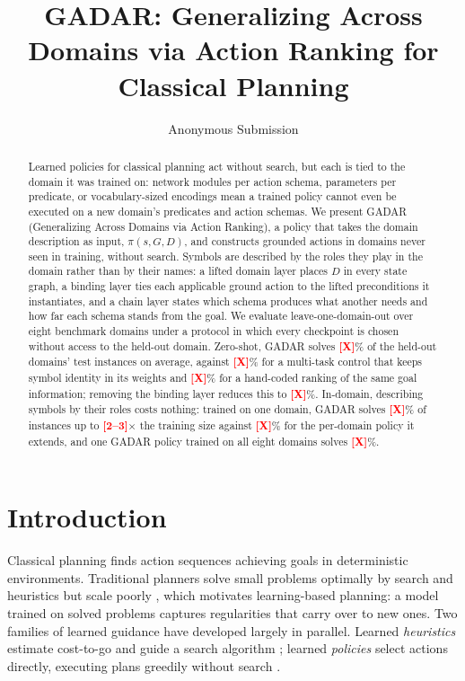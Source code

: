 \documentclass[letterpaper]{article} %
\title{GADAR: Generalizing Across Domains via Action Ranking for Classical Planning}
\author{Anonymous Submission}
\newcommand{\gadar}{GADAR}                    %
\newcommand{\todonum}[1]{\textcolor{red}{\textbf{[#1]}}}
\begin{document}
\maketitle

\begin{abstract}
Learned policies for classical planning act without search, but each is tied
to the domain it was trained on: network modules per action schema,
parameters per predicate, or vocabulary-sized encodings mean a trained policy
cannot even be executed on a new domain's predicates and action schemas. We
present \gadar{} (Generalizing Across Domains via Action Ranking), a policy
that takes the domain description as input, $\pi(s, G, D)$, and constructs
grounded actions in domains never seen in training, without search. Symbols
are described by the roles they play in the domain rather than by their
names: a lifted domain layer places $D$ in every state graph, a binding layer
ties each applicable ground action to the lifted preconditions it
instantiates, and a chain layer states which schema produces what another
needs and how far each schema stands from the goal. We evaluate
leave-one-domain-out over eight benchmark domains under a protocol in which
every checkpoint is chosen without access to the held-out domain. Zero-shot,
\gadar{} solves \todonum{X}\% of the held-out domains' test instances on
average, against \todonum{X}\% for a multi-task control that keeps symbol
identity in its weights and \todonum{X}\% for a hand-coded ranking of the
same goal information; removing the binding layer reduces this to
\todonum{X}\%. In-domain, describing symbols by their roles costs nothing:
trained on one domain, \gadar{} solves \todonum{X}\% of instances up to
\todonum{2--3}$\times$ the training size against \todonum{X}\% for the
per-domain policy it extends, and one \gadar{} policy trained on all eight
domains solves \todonum{X}\%.
\end{abstract}

\section{Introduction}

Classical planning finds action sequences achieving goals in deterministic
environments. Traditional planners solve small problems optimally by search
and heuristics but scale poorly \citep{complexity-planning, fast_downward},
which motivates learning-based planning: a model trained on solved problems
captures regularities that carry over to new ones. Two families of learned
guidance have developed largely in parallel. Learned \emph{heuristics}
estimate cost-to-go and guide a search algorithm \citep{strips_hgn,
karia2021learning, goose_v2}; learned \emph{policies} select actions
directly, executing plans greedily without search \citep{toyer2020asnets,
expressive_v1, gabar}.
\end{document}

